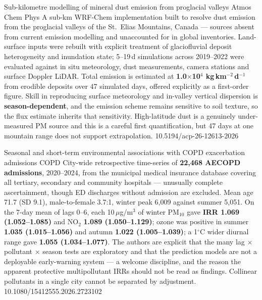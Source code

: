 \documentclass[10pt]{article}
\begin{document}
{Sub-kilometre modelling of mineral dust emission from proglacial valleys}
{Atmos Chem Phys}
{A sub-km WRF-Chem implementation built to resolve dust emission from the proglacial valleys
of the St.\ Elias Mountains, Canada --- sources absent from current emission modelling and
unaccounted for in global inventories. Land-surface inputs were rebuilt with explicit
treatment of glaciofluvial deposit heterogeneity and inundation state; 5--19\,d simulations
across 2019--2022 were evaluated against in situ meteorology, dust measurements, camera
stations and surface Doppler LiDAR. Total emission is estimated at \textbf{1.0$\times$10$^4$
kg\,km$^{-2}$\,d$^{-1}$} from erodible deposits over 47 simulated days, offered explicitly as
a first-order figure. Skill in reproducing surface meteorology and in-valley vertical
dispersion is \textbf{season-dependent}, and the emission scheme remains sensitive to soil
texture, so the flux estimate inherits that sensitivity. High-latitude dust is a genuinely
under-measured PM source and this is a careful first quantification, but 47 days at one
mountain range does not support extrapolation.}
{10.5194/acp-26-12613-2026}


{Seasonal and short-term environmental associations with COPD exacerbation admissions}
{COPD}
{City-wide retrospective time-series of \textbf{22{,}468 AECOPD admissions}, 2020--2024, from
the municipal medical insurance database covering all tertiary, secondary and community
hospitals --- unusually complete ascertainment, though ED discharges without admission are
excluded. Mean age 71.7 (SD 9.1), male-to-female 3.7:1, winter peak 6{,}009 against summer
5{,}051. On the 7-day mean of lags 0--6, each 10\,$\mu$g/m$^3$ of winter PM$_{10}$ gave
\textbf{IRR 1.069 (1.052--1.085)} and NO$_2$ \textbf{1.089 (1.050--1.129)}; ozone was positive
in summer \textbf{1.035 (1.015--1.056)} and autumn \textbf{1.022 (1.005--1.039)}; a
1$^\circ$C wider diurnal range gave \textbf{1.055 (1.034--1.077)}. The authors are explicit
that the many lag $\times$ pollutant $\times$ season tests are exploratory and that the
prediction models are not a deployable early-warning system --- a welcome discipline, and the
reason the apparent protective multipollutant IRRs should not be read as findings. Collinear
pollutants in a single city cannot be separated by adjustment.}
{10.1080/15412555.2026.2723102}
\end{document}
